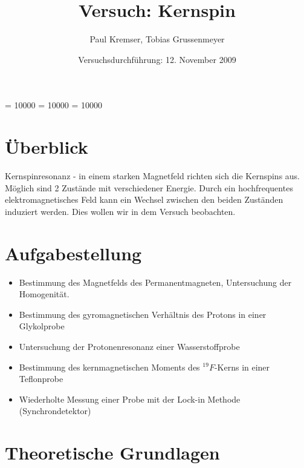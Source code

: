 \documentclass[12pt]{article}
\newcommand{\changefont}[3]{
\fontfamily{#1} \fontseries{#2} \fontshape{#3} \selectfont}
\begin{document}
\clubpenalty = 10000
\widowpenalty = 10000 
\displaywidowpenalty = 10000

\onehalfspacing
\changefont{ptm}{m}{n} 

\begin{titlepage}
\author{Paul Kremser, Tobias Grussenmeyer}
\title{Versuch: Kernspin}
\date{Versuchsdurchführung: 12. November 2009} 
\maketitle
\thispagestyle{empty}
\end{titlepage}


\tableofcontents
\thispagestyle{empty}
\newpage
{}
\section{Überblick}
Kernspinresonanz - in einem starken Magnetfeld richten sich die Kernspins aus. Möglich sind 2 Zustände mit verschiedener Energie. Durch ein hochfrequentes elektromagnetisches Feld kann ein Wechsel zwischen den beiden Zuständen induziert werden. Dies wollen wir in dem Versuch beobachten.

\section{Aufgabestellung}
\begin{itemize}
 \item Bestimmung des Magnetfelds des Permanentmagneten, Untersuchung der Homogenität.
 \item Bestimmung des gyromagnetischen Verhältnis des Protons in einer Glykolprobe
 \item Untersuchung der Protonenresonanz einer Wasserstoffprobe
 \item Bestimmung des kernmagnetischen Moments des $^{19}F$-Kerns in einer Teflonprobe
 \item Wiederholte Messung einer Probe mit der Lock-in Methode (Synchrondetektor)
\end{itemize}


\section{Theoretische Grundlagen}
\end{document}
